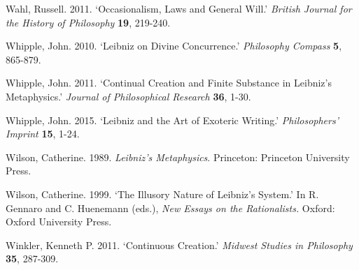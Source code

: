 \documentclass{article}
\begin{document}
Wahl, Russell. 2011. `Occasionalism, Laws and General Will.'
\emph{British Journal for the History of Philosophy} \textbf{19},
219-240.

Whipple, John. 2010. `Leibniz on Divine Concurrence.' \emph{Philosophy
Compass} \textbf{5}, 865-879.

Whipple, John. 2011. `Continual Creation and Finite Substance in
Leibniz's Metaphysics.' \emph{Journal of Philosophical Research}
\textbf{36}, 1-30.

Whipple, John. 2015. `Leibniz and the Art of Exoteric Writing.'
\emph{Philosophers' Imprint} \textbf{15}, 1-24.

Wilson, Catherine. 1989. \emph{Leibniz's Metaphysics}. Princeton:
Princeton University Press.

Wilson, Catherine. 1999. `The Illusory Nature of Leibniz's System.' In
R. Gennaro and C. Huenemann (eds.), \emph{New Essays on the
Rationalists.} Oxford: Oxford University Press.

Winkler, Kenneth P. 2011. `Continuous Creation.' \emph{Midwest Studies
in Philosophy} \textbf{35}, 287-309.
\printbibliography
\end{document}
